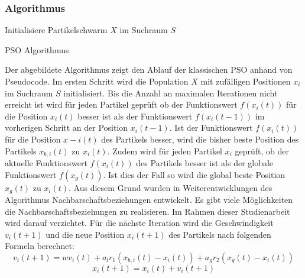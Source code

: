 \documentclass[a4paper, 11pt]{article}
\begin{document}
\subsubsection{Algorithmus}
\begin{framed}
	\begin{algorithm}[H]
		Initialisiere Partikelschwarm $X$ im Suchraum $S$\;
		\caption{\acs{PSO} Algorithmus}
		\label{psoalgo}
	\end{algorithm}
\end{framed}
Der abgebildete Algorithmus zeigt den Ablauf der klassischen \acs{PSO} anhand von Pseudocode. Im ersten Schritt wird die Population $X$ mit zufälligen Positionen $x_{i}$ im Suchraum $S$ initialisiert. Bis die Anzahl an maximalen Iterationen nicht erreicht ist wird für jeden Partikel geprüft ob der Funktionswert $f(x_{i}(t))$ für die Position $x_{i}(t)$ besser ist als der Funktionswert $f(x_{i}(t-1))$ im vorherigen Schritt an der Position $x_{i}(t-1)$. Ist der Funktionswert $f(x_{i}(t))$ für die Position $x-{i}(t)$ des Partikels besser, wird die bisher beste Position des Partikels $x_{b,i}(t)$ zu $x_{i}(t)$. Zudem wird für jeden Partikel $x_{i}$ geprüft, ob der aktuelle Funktionswert $f(x_{i}(t))$ des Partikels besser ist als der globale Funktionswert $f(x_{g}(t))$. Ist dies der Fall so wird die global beste Position $x_{g}(t)$ zu $x_{i}(t)$. Aus diesem Grund wurden in Weiterentwicklungen des Algorithmus Nachbarschaftsbeziehungen entwickelt. Es gibt viele Möglichkeiten die Nachbarschaftsbeziehungen zu realisieren. Im Rahmen dieser Studienarbeit wird darauf verzichtet. Für die nächste Iteration wird die Geschwindigkeit $v_{i}(t+1)$ und die neue Position $x_{i}(t+1)$ des Partikels nach folgenden Formeln berechnet:
\begin{equation}
v_{i}(t+1) = wv_{i}(t) + a_{l}r_{1}(x_{b,i}(t) - x_{i}(t)) + a_{g}r_{2}(x_{g}(t) - x_{i}(t))
\end{equation} 
\begin{equation}
x_{i}(t+1) = x_{i}(t) + v_{i}(t+1)
\end{equation}
\end{document}
